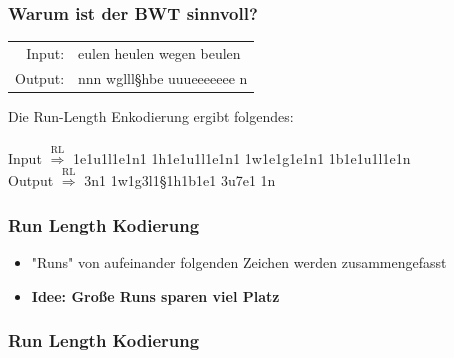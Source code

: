 \documentclass{beamer}
\newcommand{\R}{\Rightarrow}
\begin{document}
\begin{frame}
    \frametitle{Warum ist der BWT sinnvoll?}
    \begin{tcolorbox}[yellow]
        \begin{center}
            \begin{tabular}{rl}
                Input: &eulen heulen wegen beulen\\
                Output: &nnn wglll§hbe uuueeeeeee n
            \end{tabular}
        \end{center}
    \end{tcolorbox}\pause\vspace*{0.3cm}
    Die Run-Length Enkodierung ergibt folgendes:\\~\\\pause
    \hspace*{0.3cm}
    Input \hspace*{0.3cm}$\overset{\text{RL}}{\R}$ 1e1u1l1e1n1 1h1e1u1l1e1n1 1w1e1g1e1n1 1b1e1u1l1e1n\\\pause
    \hspace*{0.3cm}
    Output $\overset{\text{RL}}{\R}$ 3n1 1w1g3l1§1h1b1e1 3u7e1 1n
    \pause\vspace*{0.3cm}
    \begin{tcolorbox}[standard, title=Wann ist BWT also sinnvoll:]
        \begin{itemize}
        \end{itemize}
    \end{tcolorbox}
\end{frame}
\begin{frame}
    \frametitle{Run Length Kodierung}
    \begin{tcolorbox}[standard, title=Überblick]
        \begin{itemize}
            \item "Runs" von aufeinander folgenden Zeichen werden zusammengefasst
            \item \textbf{Idee: Große Runs sparen viel Platz}
        \end{itemize}
    \end{tcolorbox}
\end{frame}
\begin{frame}
    \frametitle{Run Length Kodierung}
    
\end{frame}
\end{document}
